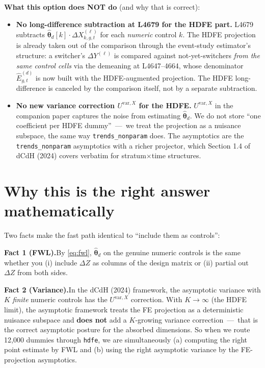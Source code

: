 \documentclass[11pt]{article}
\newcommand{\code}[1]{\texttt{\small #1}}
\newcommand{\1}{\mathbb{1}}
\newcommand{\thetad}{\widehat{\bm{\theta}}_d}
\begin{document}
\medskip
\noindent
\textbf{What this option does NOT do} (and why that is correct):
\begin{itemize}[leftmargin=*, itemsep=2pt]
\item \textbf{No long-difference subtraction at L4679 for the HDFE part.}
      L4679 subtracts $\thetad[k]\cdot \Delta X^{(\ell)}_{k,g,t}$ for each
      \emph{numeric} control $k$. The HDFE projection is already taken out
      of the comparison through the event-study estimator's structure: a
      switcher's $\Delta Y^{(\ell)}$ is compared against not-yet-switchers
      \emph{from the same control cells} via the demeaning at L4647--4664,
      whose denominator $\widehat{E}^{(d)}_{g,t}$ is now built with the
      HDFE-augmented projection. The HDFE long-difference is canceled by
      the comparison itself, not by a separate subtraction.
\item \textbf{No new variance correction $U^{\mathrm{var},X}$ for the HDFE.}
      $U^{\mathrm{var},X}$ in the companion paper captures the noise from
      estimating $\thetad$. We do not store ``one coefficient per HDFE
      dummy'' \,---\, we treat the projection as a nuisance subspace, the
      same way \code{trends\_nonparam} does. The asymptotics are the
      \texttt{trends\_nonparam} asymptotics with a richer projector, which
      Section 1.4 of dCdH (2024) covers verbatim for stratum$\times$time
      structures.
\end{itemize}

\section{Why this is the right answer mathematically}

Two facts make the fast path identical to ``include them as controls'':

\medskip
\noindent
\textbf{Fact 1 (FWL).}\;By \eqref{eq:fwl}, $\thetad$ on the genuine numeric
controls is the same whether you (i) include $\Delta Z$ as columns of the
design matrix or (ii) partial out $\Delta Z$ from both sides.

\medskip
\noindent
\textbf{Fact 2 (Variance).}\;In the dCdH (2024) framework, the asymptotic
variance with $K$ \emph{finite} numeric controls has the $U^{\mathrm{var},X}$
correction. With $K \to \infty$ (the HDFE limit), the asymptotic framework
treats the FE projection as a deterministic nuisance subspace and
\textbf{does not} add a $K$-growing variance correction \,---\, that is the
correct asymptotic posture for the absorbed dimensions. So when we route
12{,}000 dummies through \code{hdfe}, we are simultaneously (a) computing
the right point estimate by FWL and (b) using the right asymptotic variance
by the FE-projection asymptotics.
\end{document}
